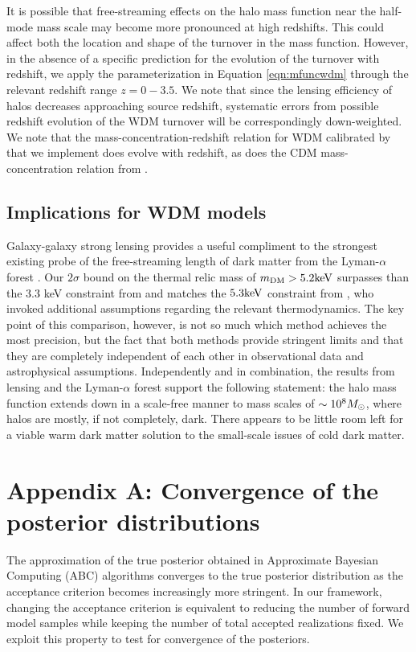 It is possible that free-streaming effects on the halo mass function near the half-mode mass scale may become more pronounced at high redshifts. This could affect both the location and shape of the turnover in the mass function. However, in the absence of a specific prediction for the evolution of the turnover with redshift, we apply the parameterization in Equation \ref{eqn:mfuncwdm} through the relevant redshift range $z = 0 - 3.5$. We note that since the lensing efficiency of halos decreases approaching source redshift, systematic errors from possible redshift evolution of the WDM turnover will be correspondingly down-weighted. We note that the mass-concentration-redshift relation for WDM calibrated by \cite{Bose++16} that we implement does evolve with redshift, as does the CDM mass-concentration relation from \cite{DiemerJoyce18}. 

\subsection{Implications for WDM models}
\label{ssec:implications}

Galaxy-galaxy strong lensing provides a useful compliment to the strongest existing probe of the free-streaming length of dark matter from the Lyman-$\alpha$ forest \cite{Viel13,Irsic++17}. Our $2 \sigma$ bound on the thermal relic mass of $m_{\rm{DM}} > 5.2 \rm{keV}$ surpasses than the 3.3 keV constraint from \cite{Viel13} and matches the $5.3 \rm{keV}$ constraint from \cite{Irsic++17}, who invoked additional assumptions regarding the relevant thermodynamics. The key point of this comparison, however, is not so much which method achieves the most precision, but the fact that both methods provide stringent limits and that they are completely independent of each other in observational data and astrophysical assumptions. Independently and in combination, the results from lensing and the Lyman-$\alpha$ forest support the following statement: the halo mass function extends down in a scale-free manner to mass scales of $\sim 10^{8} {M_{\odot}}$, where halos are mostly, if not completely, dark. There appears to be little room left for a viable warm dark matter solution to the small-scale issues of cold dark matter. 

\section{\bf Appendix A: Convergence of the posterior distributions}
\label{app:A}
The approximation of the true posterior obtained in Approximate Bayesian Computing (ABC) algorithms converges to the true posterior distribution as the acceptance criterion becomes increasingly more stringent. In our framework, changing the acceptance criterion is equivalent to reducing the number of forward model samples while keeping the number of total accepted realizations fixed. We exploit this property to test for convergence of the posteriors. 

